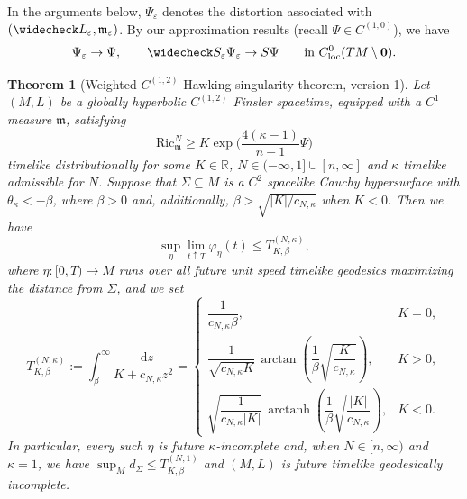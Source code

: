 \documentclass[a4paper,11pt]{article}
\numberwithin{equation}{section}
\theoremstyle{definition}
\theoremstyle{plain}
\newtheorem{Theorem}[Definition]{Theorem}
\newcommand{\R}{\mathbb R}
\newcommand{\Ric}{\mathrm{Ric}}
\newcommand{\m}{\mathfrak m}
\newcommand*\diff{\mathop{}\!\mathrm{d}}
\begin{document}
In the arguments below, $\Psi_\varepsilon$ denotes the distortion associated with $(\widecheck L_\varepsilon,\mathfrak m_\varepsilon)$. 
By our approximation results (recall $\Psi \in C^{(1,0)}$), we have
\begin{equation*}
    \Psi_\varepsilon\to\Psi,
    \qquad
    \widecheck S_\varepsilon\Psi_\varepsilon\to S\Psi \qquad \text{in } C^0_{\mathrm{loc}}(TM\setminus \mathbf 0).
\end{equation*}

\begin{Theorem}[Weighted $C^{(1,2)}$ Hawking singularity theorem, version 1]
\label{theorem: weighted hawking 1}
Let $(M,L)$ be a globally hyperbolic $C^{(1,2)}$ Finsler spacetime, equipped with a $C^1$ measure $\mathfrak m$, satisfying 
\[
\Ric^N_\m \geq K\exp\biggl( \frac{4(\kappa-1)}{n-1}\Psi \biggr)
\]
timelike distributionally for some $K\in\R$, $N \in (-\infty,1] \cup [n,\infty]$ and $\kappa$ timelike admissible for $N$.
Suppose that $\Sigma\subseteq M$ is a $C^2$ spacelike Cauchy hypersurface with $\theta_\kappa <-\beta$,
where $\beta>0$ and, additionally, $\beta>\sqrt{|K|/c_{N,\kappa}}$
when $K<0$.
Then we have
\[
\sup_\eta \lim_{t \uparrow T} \varphi_\eta(t) \leq T^{(N,\kappa)}_{K,\beta},
\]
where $\eta:[0,T) \to M$ runs over all future unit speed timelike geodesics maximizing the distance from $\Sigma$, and we set 
\[
    T^{(N,\kappa)}_{K,\beta}
    :=
    \int_\beta^\infty
        \frac{\diff z}{K+c_{N,\kappa}z^2}
    =
    \begin{cases}
        \dfrac{1}{c_{N,\kappa}\beta},
        & K=0,\\[1.2ex]
        \dfrac{1}{\sqrt{c_{N,\kappa}K}}\,
        \arctan\!\left(
            \dfrac{1}{\beta}\sqrt{\dfrac{K}{c_{N,\kappa}}}
        \right),
        & K>0,\\[1.6ex]
        \sqrt{\dfrac{1}{c_{N,\kappa}|K|}}\,
        \operatorname{arctanh}\!\left(
            \dfrac{1}{\beta}\sqrt{\dfrac{|K|}{c_{N,\kappa}}}
        \right),
        & K<0.
    \end{cases}
\]
In particular, every such $\eta$ is future $\kappa$-incomplete and, when $N \in [n,\infty)$ and $\kappa=1$, we have $\sup_M d_\Sigma \le T^{(N,1)}_{K,\beta}$ and $(M,L)$ is future timelike geodesically incomplete.
\end{Theorem}
\end{document}

